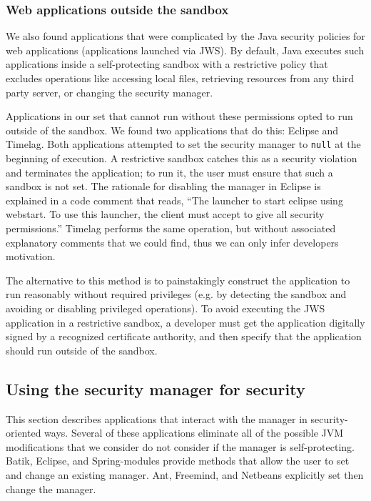 \documentclass{sig-alternate}
\begin{document}
\subsubsection{Web applications outside the sandbox}\label{sub:Reducing-Web-Application-Complexity}

We also found applications that were complicated by the Java security policies
for web applications (applications launched via JWS). By default,
Java executes such applications inside a self-protecting 
sandbox with a restrictive policy that excludes
operations like accessing local files, retrieving resources
from any third party server, or changing the security manager. 

Applications in our set that cannot run without these permissions
opted to run outside of the sandbox.  
We found two applications that do this: Eclipse and
Timelag.  Both applications attempted
to set the security manager to \texttt{null} at the beginning of execution.
A restrictive sandbox catches this as a security violation and terminates the
application; to run it, the user must ensure that such a sandbox is not set.
The rationale for disabling the manager in Eclipse is explained in a 
code comment that reads, ``The launcher to start eclipse using webstart. To use
this launcher, the client must accept to give all security permissions.'' Timelag
performs the same operation, but without associated explanatory comments that we
could find, thus we can only 
infer developers motivation. 

The alternative to this method is to painstakingly
construct the application to run reasonably without required privileges (e.g. by
detecting the sandbox and avoiding or disabling privileged operations). To avoid executing
the JWS application in a restrictive 
sandbox, a developer must get the application digitally signed
by a recognized certificate authority, and then specify that the application should
run outside of the sandbox. 

\subsection{Using the security manager for security}
\label{sub:Using-the-Security}

This section describes applications that interact with the manager in
security-oriented ways.  Several of these applications eliminate all of the possible
JVM modifications that we consider do not consider if the manager is self-protecting.  Batik,
Eclipse, and Spring-modules provide 
methods that allow the user to set and change an existing manager. 
Ant, Freemind, and Netbeans explicitly set then change the manager.
\end{document}
